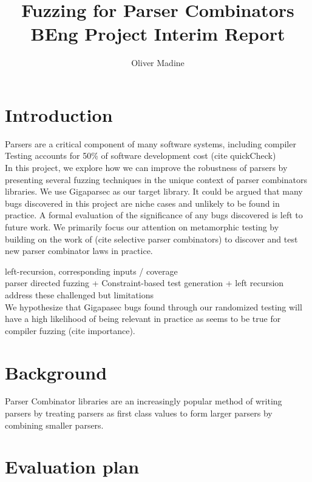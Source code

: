 \documentclass{article}
\title{Fuzzing for Parser Combinators \\ {\large BEng Project Interim Report}}
\author{Oliver Madine}
\date{}
\begin{document}
\maketitle

\begin{multicols}{2}

\section{Introduction}

Parsers are a critical component of many software systems, including compiler
Testing accounts for 50\% of software development cost (cite quickCheck)
\\

In this project, we explore how we can improve the robustness of parsers by presenting several
fuzzing techniques in the unique context of parser combinators libraries. We use Gigaparsec as
our target library. It could be argued that many bugs discovered in this project are niche cases
and unlikely to be found in practice. A formal evaluation of the significance of any bugs discovered
is left to future work. We primarily focus our attention on metamorphic testing by building on the 
work of (cite selective parser combinators) to discover and test new parser combinator laws in
practice.

left-recursion, corresponding inputs / coverage
\\

parser directed fuzzing + Constraint-based test generation + left recursion address these challenged but limitations
\\

We hypothesize that Gigapasec bugs found through our randomized testing will have a high likelihood of being relevant in practice as seems to be true for compiler fuzzing (cite importance).

\section{Background}
Parser Combinator libraries are an increasingly popular method of writing parsers by treating parsers as first class values to form larger parsers by
combining smaller parsers.

\section{Evaluation plan}


\end{multicols}



\end{document}

